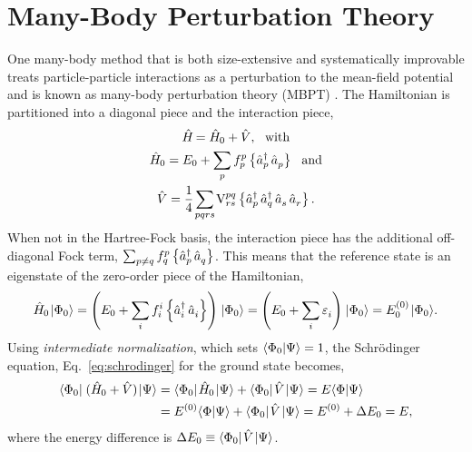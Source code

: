 \documentclass[thesis.tex]{subfiles}
\begin{document}
\section{Many-Body Perturbation Theory} \label{section:MBPT}
One many-body method that is both size-extensive and systematically improvable treats particle-particle interactions as a perturbation to the mean-field potential and is known as many-body perturbation theory (MBPT) \cite{MOLLER1934,HUBBARD1957539,HUGENHOLTZ1957481,SHAVITT2009}.  The Hamiltonian is partitioned into a diagonal piece and the interaction piece,
\begin{gather} \label{eq:mbpt_hamiltonian}
  \Ham = \Ham_{0} + \hat{V},\ \ \text{with} \notag \\
  \Ham_{0} = E_{0} + \sum_{\mathclap{p}}\fint{p}{p}\normord{\co{p}\ao{p}}\ \ \text{and} \notag \\
  \hat{V} = \frac{1}{4}\sum_{\mathclap{pqrs}}\vint{pq}{rs}\normord{\co{p}\co{q}\ao{s}\ao{r}}.
\end{gather}
When not in the Hartree-Fock basis, the interaction piece has the additional off-diagonal Fock term, $\sum_{p\neq q}f^{p}_{q}\left\{\mathop{\hat{a}^{\dagger}_{p}}\mathop{\hat{a}^{}_{q}}\right\}$.  This means that the reference state is an eigenstate of the zero-order piece of the Hamiltonian,
\begin{equation}
  \Ham_{0}\refket = \left(E_{0} + \sum_{\mathclap{i}}\fint{i}{i}\normord{\co{i}\ao{i}}\right)\refket = \left(E_{0} + \sum_{\mathclap{i}}\Edenom{}{i}\right)\refket = E^{(0)}_{0}\refket.
\end{equation}
Using \textit{intermediate normalization}, which sets $\langle \Phi_{0} | \Psi\rangle = 1$, the Schr\"{o}dinger equation, Eq.\ \eqref{eq:schrodinger} for the ground state becomes,
\begin{align}
  \langle \Phi_{0} |\hspace{1pt}\mathop{(\hat{H}\hspace{-1pt}_{0} + \hat{V})}\hspace{1pt}\lvert \Psi \rangle &= \langle \Phi_{0} |\hspace{1pt}\hat{H}\hspace{-1pt}_{0}\hspace{1pt}\lvert \Psi \rangle + \langle \Phi_{0} |\hspace{1pt}\hat{V}\hspace{1pt}\lvert \Psi \rangle = E\langle \Phi | \Psi\rangle \notag \\
  &= E^{(0)}\langle \Phi | \Psi\rangle + \langle \Phi_{0} |\hspace{1pt}\hat{V}\hspace{1pt}\lvert \Psi \rangle = E^{(0)} + \Delta E_{0} = E, \label{eq:mbpt_schrodinger}
\end{align}
where the energy difference is $\Delta E_{0} \equiv \langle \Phi_{0} |\hspace{1pt}\hat{V}\hspace{1pt}\lvert \Psi \rangle$.
\end{document}
